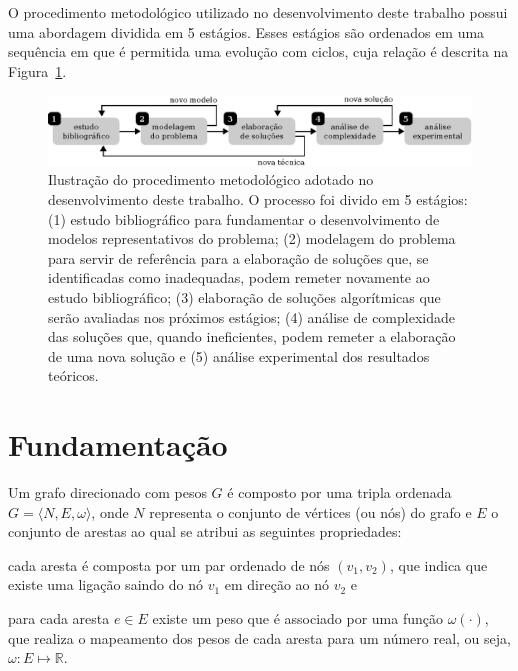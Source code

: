 \documentclass[11pt,a4paper]{article}
\begin{document}
O procedimento metodológico utilizado no desenvolvimento deste trabalho
possui uma abordagem dividida em 5 estágios.
Esses estágios são ordenados em uma sequência em que é permitida uma evolução
com ciclos, cuja relação é descrita na Figura~\ref{fig:metodologia}.

\begin{figure}[ht]
\centering
\includegraphics[scale=1]{image/metodologia}
\caption[Ilustração do procedimento metodológico]
    {Ilustração do procedimento metodológico adotado no desenvolvimento deste
    trabalho.
    O processo foi divido em 5 estágios:
    (1) estudo bibliográfico para fundamentar o desenvolvimento de modelos
        representativos do problema;
    (2) modelagem do problema para servir de referência para a elaboração de
        soluções que, se identificadas como inadequadas, podem remeter
        novamente ao estudo bibliográfico;
    (3) elaboração de soluções algorítmicas que serão avaliadas nos próximos
        estágios;
    (4) análise de complexidade das soluções que, quando ineficientes, podem
        remeter a elaboração de uma nova solução e
    (5) análise experimental dos resultados teóricos.}
\label{fig:metodologia}
\end{figure}

\section{Fundamentação}
\label{sec:2:fundamentacao}

\begin{definicao}\label{def:grafo}
%
%
\cite{cormen2009algorithms}
Um grafo direcionado com pesos $G$ é composto por uma tripla ordenada
$G=\langle N, E, \omega \rangle$, onde $N$ representa o conjunto de vértices
(ou nós) do grafo e $E$ o conjunto de arestas ao qual se atribui as seguintes
propriedades:
\begin{inparaenum}[(i)]
\item cada aresta é composta por um par ordenado de nós $(v_1,v_2)$, que
    indica que existe uma ligação saindo do nó $v_1$ em direção ao nó $v_2$ e
\item para cada aresta $e \in E$ existe um peso que é associado por uma
    função $\omega(\cdot)$, que realiza o mapeamento dos pesos de cada aresta
    para um número real, ou seja, $\omega \colon E\mapsto\mathbb{R}$.
\end{inparaenum}
\end{definicao}
\end{document}
